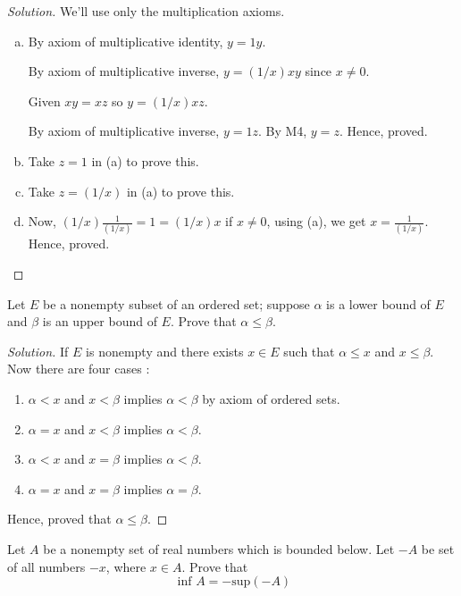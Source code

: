 \begin{proof}[Solution]
	We'll use only the multiplication axioms.
	\begin{enumerate}[a)]
		\item
			By axiom of multiplicative identity, $y = 1y$.

			By axiom of multiplicative inverse, $y = (1/x) x y$ since $x \neq 0$.

			Given $xy = xz$ so $y = (1/x) x z$.

			By axiom of multiplicative inverse, $y = 1z$. By M4, $y = z$. Hence, proved.

		\item Take $z = 1$ in (a) to prove this.
		\item Take $z = (1/x)$ in (a) to prove this.
		\item Now, $(1/x) \frac{1}{(1/x)} = 1 = (1/x) x $ if $x \neq 0$, using (a),
		we get $x = \frac{1}{(1/x)}$. Hence, proved.
	\end{enumerate}
\end{proof}

\begin{prblm}
	Let $E$ be a nonempty subset of an ordered set;
	suppose $\alpha$ is a lower bound of $E$ and $\beta$ is an upper bound of $E$.
	Prove that $\alpha \leq \beta$.
\end{prblm}

\begin{proof}[Solution]
	If $E$ is nonempty and there exists $x \in E$ such that $\alpha \leq x$ and $x \leq \beta$.
	Now there are four cases :
	\begin{enumerate}
		\item $\alpha < x$ and $x < \beta$ implies $\alpha < \beta$ by axiom of ordered sets.
		\item $\alpha = x$ and $x < \beta$ implies $\alpha < \beta$.
		\item $\alpha < x$ and $x = \beta$ implies $\alpha < \beta$.
		\item $\alpha = x$ and $x = \beta$ implies $\alpha = \beta$.
	\end{enumerate}
	Hence, proved that $\alpha \leq \beta$.
\end{proof}


\begin{prblm}
	Let $A$ be a nonempty set of real numbers which is bounded below.
	Let $-A$ be set of all numbers $-x$, where $x \in A$. Prove that
	$$ \text{ inf } A = - \text{sup}(-A) $$
\end{prblm}

